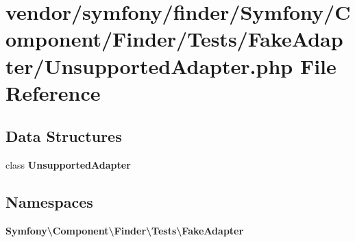 \section{vendor/symfony/finder/\+Symfony/\+Component/\+Finder/\+Tests/\+Fake\+Adapter/\+Unsupported\+Adapter.php File Reference}
\label{_unsupported_adapter_8php}
\subsection*{Data Structures}
\begin{DoxyCompactItemize}
\item 
class {\bf Unsupported\+Adapter}
\end{DoxyCompactItemize}
\subsection*{Namespaces}
\begin{DoxyCompactItemize}
\item 
 {\bf Symfony\textbackslash{}\+Component\textbackslash{}\+Finder\textbackslash{}\+Tests\textbackslash{}\+Fake\+Adapter}
\end{DoxyCompactItemize}
